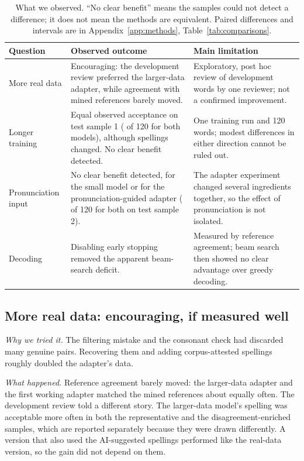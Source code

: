 \documentclass[10pt,a4paper,twocolumn]{article}
\begin{document}
\begin{table}[t]
\centering\small
\caption{What we observed. ``No clear benefit'' means the samples could not detect a difference; it does not mean
the methods are equivalent. Paired differences and intervals are in Appendix~\ref{app:methods},
Table~\ref{tab:comparisons}.}
\label{tab:outcomes}
\begin{tabularx}{\textwidth}{@{}>{\raggedright\arraybackslash}p{2.6cm}L>{\raggedright\arraybackslash}p{5.6cm}@{}}
\toprule
Question & Observed outcome & Main limitation \\
\midrule
More real data & Encouraging: the development review preferred the larger-data adapter, while agreement with
  mined references barely moved. & Exploratory, post hoc review of development words by one reviewer; not a
  confirmed improvement. \\
Longer training & Equal observed acceptance on test sample 1 ( of 120 for both models),
  although  spellings changed. No clear benefit detected. & One training run and 120 words; modest
  differences in either direction cannot be ruled out. \\
Pronunciation input & No clear benefit detected, for the small model or for the pronunciation-guided adapter
  ( of 120 for both on test sample 2). & The adapter experiment changed several ingredients
  together, so the effect of pronunciation is not isolated. \\
Decoding & Disabling early stopping removed the apparent beam-search deficit. & Measured by reference agreement;
  beam search then showed no clear advantage over greedy decoding. \\
\bottomrule
\end{tabularx}
\end{table}

\subsection{More real data: encouraging, if measured well}
\emph{Why we tried it.} The filtering mistake and the consonant check had discarded many genuine pairs. Recovering
them and adding corpus-attested spellings roughly doubled the adapter's data.

\emph{What happened.} Reference agreement barely moved: the larger-data adapter and the first working adapter
matched the mined references about equally often. The development review told a different story. The larger-data
model's spelling was acceptable more often in both the representative and the disagreement-enriched samples, which
are reported separately because they were drawn differently. A version that also used the AI-suggested spellings
performed like the real-data version, so the gain did not depend on them.
\end{document}
